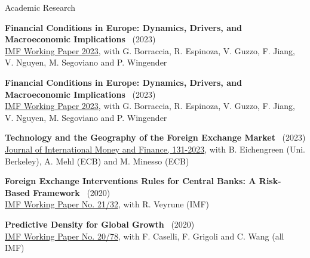 \documentclass[usegeometry, 10pt, a4paper]{cv} %
\newcommand{\activite}[1]{\textbf{#1}\ }
\begin{document}
\begin{rubriquetableau}[0.95\textwidth]{Academic Research}\\
  \vspace{-0.5cm}


\activite{Financial Conditions in Europe: Dynamics, Drivers, and Macroeconomic Implications} (2023)\\
\hspace{0.6cm} \small{\href{https://www.imf.org/en/Publications/WP/Issues/2023/09/29/Financial-Conditions-in-Europe-Dynamics-Drivers-and-Macroeconomic-Implications-539653}{IMF Working Paper 2023}, with G. Borraccia, R. Espinoza, V. Guzzo, F. Jiang, V. Nguyen, M. Segoviano and P. Wingender}
\vspace{0.4cm} 


\activite{Financial Conditions in Europe: Dynamics, Drivers, and Macroeconomic Implications} (2023)\\
\hspace{0.6cm} \small{\href{https://www.imf.org/en/Publications/WP/Issues/2023/09/29/Financial-Conditions-in-Europe-Dynamics-Drivers-and-Macroeconomic-Implications-539653}{IMF Working Paper 2023}, with G. Borraccia, R. Espinoza, V. Guzzo, F. Jiang, V. Nguyen, M. Segoviano and P. Wingender}
\vspace{0.4cm} 

\activite{Technology and the Geography of the Foreign Exchange Market} (2023)\\
\hspace{0.6cm} \small{\href{https://www.sciencedirect.com/science/article/abs/pii/S0261560623000037}{Journal of International Money and Finance, 131-2023}, with B. Eichengreen (Uni. Berkeley), A. Mehl (ECB) and M. Minesso (ECB)}
\vspace{0.4cm} 
  
\activite{Foreign Exchange Interventions Rules for Central Banks: A Risk-Based Framework} (2020) \\
\hspace{0.6cm} \small{\href{https://www.imf.org/en/Publications/WP/Issues/2021/02/12/Foreign-Exchange-Intervention-Rules-for-Central-Banks-A-Risk-based-Framework-50081}{IMF Working Paper No. 21/32}, with R. Veyrune (IMF)}
\vspace{0.4cm} 
  

\activite{Predictive Density for Global Growth} (2020) \\
\hspace{0.6cm} \small{\href{https://www.imf.org/en/Publications/WP/Issues/2020/05/29/Predictive-Density-Aggregation-A-Model-for-Global-GDP-Growth-49441}{IMF Working Paper No. 20/78}, with F. Caselli, F. Grigoli and C. Wang (all IMF)}
\vspace{0.4cm} 


\end{rubriquetableau}
\end{document}
